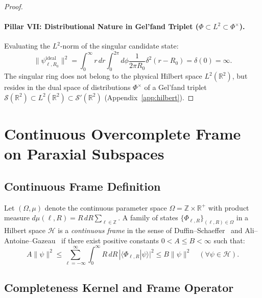 \documentclass[11pt,a4paper]{article}
\begin{document}
\begin{proof}
\paragraph{Pillar VII: Distributional Nature in Gel'fand Triplet ($\Phi \subset L^2 \subset \Phi^\times$).}
Evaluating the $L^2$-norm of the singular candidate state:
\begin{equation}
\boxed{\|\psi_{\ell, R_0}^{\text{ideal}}\|^2 = \int_0^\infty r \, dr \int_0^{2\pi} d\phi \frac{1}{2\pi R_0} \delta^2(r - R_0) = \delta(0) = \infty.}
\label{eq:pillar7_result}
\end{equation}
The singular ring does not belong to the physical Hilbert space $L^2(\mathbb{R}^2)$, but resides in the dual space of distributions $\Phi^\times$ of a Gel'fand triplet $\mathcal{S}(\mathbb{R}^2) \subset L^2(\mathbb{R}^2) \subset \mathcal{S}'(\mathbb{R}^2)$ (Appendix~\ref{app:hilbert}).
\end{proof}

\section{Continuous Overcomplete Frame on Paraxial Subspaces}
\label{sec:frame_theory}

\subsection{Continuous Frame Definition}

Let $(\Omega, \mu)$ denote the continuous parameter space $\Omega = \mathbb{Z} \times \mathbb{R}^+$ with product measure $d\mu(\ell, R) = R \, dR \sum_{\ell \in \mathbb{Z}}$. A family of states $\{\Phi_{\ell, R}\}_{(\ell, R) \in \Omega}$ in a Hilbert space $\mathcal{H}$ is a \emph{continuous frame} in the sense of Duffin--Schaeffer~\cite{Duffin1952} and Ali--Antoine--Gazeau~\cite{Ali1993,Daubechies1990,Christensen2016} if there exist positive constants $0 < A \le B < \infty$ such that:
\begin{equation}
A \|\psi\|^2 \le \sum_{\ell=-\infty}^\infty \int_0^\infty R \, dR \, |\langle \Phi_{\ell, R} | \psi \rangle|^2 \le B \|\psi\|^2 \quad (\forall \psi \in \mathcal{H}).
\label{eq:frame_def}
\end{equation}

\subsection{Completeness Kernel and Frame Operator}
\end{document}
